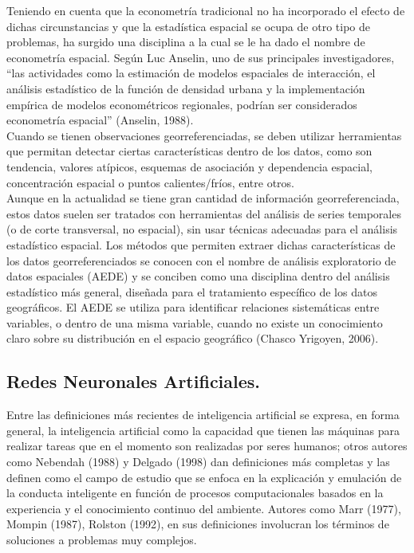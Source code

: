 Teniendo en cuenta que la econometría tradicional no ha incorporado el efecto de dichas circunstancias y que la estadística espacial se ocupa de otro tipo de problemas, ha surgido una disciplina a la cual se le ha dado el nombre de econometría espacial. Según Luc Anselin, uno de sus principales investigadores, “las actividades como la estimación de modelos espaciales de interacción, el análisis estadístico de la función de densidad urbana y la implementación empírica de modelos econométricos regionales, podrían ser considerados econometría espacial” (Anselin, 1988).\\

Cuando se tienen observaciones georreferenciadas, se deben utilizar herramientas que permitan detectar ciertas características dentro de los datos, como son tendencia, valores atípicos, esquemas de asociación y
dependencia espacial, concentración espacial o puntos calientes/fríos, entre otros.\\
Aunque en la actualidad se tiene gran cantidad de información georreferenciada, estos datos suelen ser tratados con herramientas del análisis de series temporales (o de corte transversal, no espacial), sin usar técnicas adecuadas para el análisis estadístico espacial. Los métodos que permiten extraer dichas características de los datos georreferenciados se conocen con el nombre de análisis exploratorio de datos espaciales (AEDE) y se conciben como una disciplina dentro del análisis estadístico más general, diseñada para el tratamiento específico de los datos geográficos. El AEDE se utiliza para identificar relaciones sistemáticas entre variables, o dentro de una misma variable, cuando no existe un conocimiento claro sobre su distribución en el espacio geográfico (Chasco Yrigoyen, 2006).

\subsection{Redes Neuronales Artificiales.}

Entre las definiciones más recientes de inteligencia artificial se expresa, en forma general, la inteligencia artificial como la capacidad que tienen las máquinas para realizar tareas que en el momento son realizadas por seres humanos; otros autores como Nebendah (1988) y Delgado (1998) dan definiciones más completas y las definen como el campo de estudio que se enfoca en la explicación y emulación de la conducta inteligente en función de procesos computacionales basados en la experiencia y el conocimiento continuo del ambiente. Autores como Marr (1977), Mompin (1987), Rolston (1992), en sus definiciones involucran los términos de soluciones a problemas muy complejos.\\

